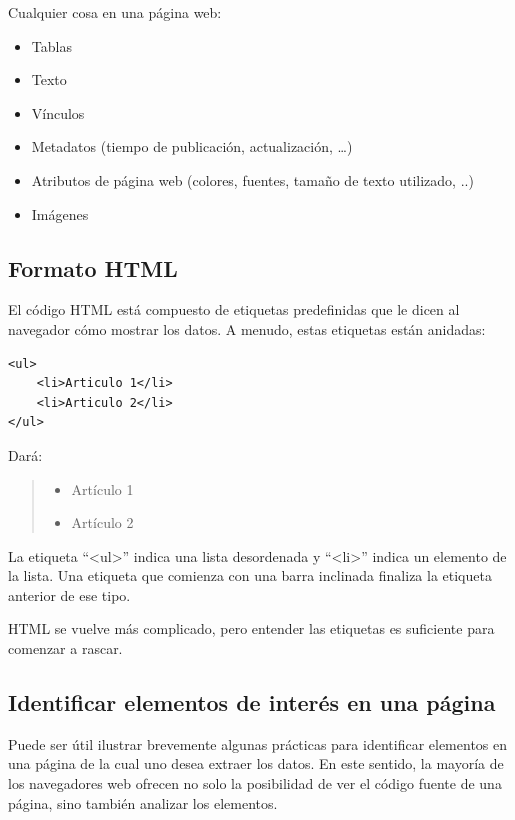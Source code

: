 \documentclass[]{article}
\providecommand{\tightlist}{%
  \setlength{\itemsep}{0pt}\setlength{\parskip}{0pt}}
\begin{document}
Cualquier cosa en una página web:

\begin{itemize}
\tightlist
\item
  Tablas
\item
  Texto
\item
  Vínculos
\item
  Metadatos (tiempo de publicación, actualización, \ldots{})
\item
  Atributos de página web (colores, fuentes, tamaño de texto utilizado,
  ..)
\item
  Imágenes
\end{itemize}

\subsection{Formato HTML}\label{formato-html}

El código HTML está compuesto de etiquetas predefinidas que le dicen al
navegador cómo mostrar los datos. A menudo, estas etiquetas están
anidadas:

\begin{verbatim}
<ul>
    <li>Articulo 1</li>
    <li>Articulo 2</li>
</ul>
\end{verbatim}

Dará:

\begin{quote}
\begin{itemize}
\tightlist
\item
  Artículo 1
\item
  Artículo 2
\end{itemize}
\end{quote}

La etiqueta ``\textless{}ul\textgreater{}'' indica una lista desordenada
y ``\textless{}li\textgreater{}'' indica un elemento de la lista. Una
etiqueta que comienza con una barra inclinada finaliza la etiqueta
anterior de ese tipo.

HTML se vuelve más complicado, pero entender las etiquetas es suficiente
para comenzar a rascar.

\subsection{Identificar elementos de interés en una
página}\label{identificar-elementos-de-interes-en-una-pagina}

Puede ser útil ilustrar brevemente algunas prácticas para identificar
elementos en una página de la cual uno desea extraer los datos. En este
sentido, la mayoría de los navegadores web ofrecen no solo la
posibilidad de ver el código fuente de una página, sino también analizar
los elementos.
\end{document}
